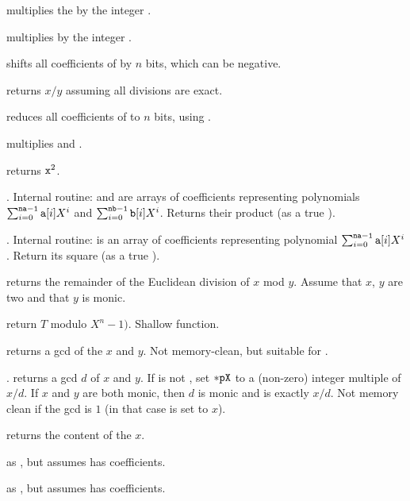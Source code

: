  multiplies the   by the
integer .

 multiplies  by the integer .

 shifts all coefficients of  by $n$
bits, which can be negative.

 returns $x/y$ assuming all divisions
are exact.

 reduces all coefficients of  to
$n$ bits, using .

 multiplies  and .

 returns ${\tt x}^2$.

. Internal routine:
 and  are arrays of coefficients representing polynomials
$\sum_{i = 0}^{{\tt na-1}} {\tt a}[i] X^i$ and
$\sum_{i = 0}^{{\tt nb-1}} {\tt b}[i] X^i$. Returns their product (as a true
).

. Internal routine:
 is an array of coefficients representing polynomial
$\sum_{i = 0}^{{\tt na-1}} {\tt a}[i] X^i$. Return its square (as a true
).

 returns the remainder of the Euclidean
division of $x$ mod $y$. Assume that $x$, $y$ are two  and that
$y$ is monic.

 return $T$ modulo $X^n - 1)$. Shallow
function.

 returns a gcd of the  $x$ and $y$.
Not memory-clean, but suitable for .

. returns a gcd $d$ of $x$ and
$y$. If  is not , set ${\tt *pX}$ to a (non-zero) integer
multiple of $x/d$. If $x$ and $y$ are both monic, then $d$ is monic and
 is exactly $x/d$. Not memory clean if the gcd is $1$
(in that case  is set to $x$).

 returns the content of the  $x$.

 as , but assumes  has 
coefficients.

 as , but assumes
 has  coefficients.

